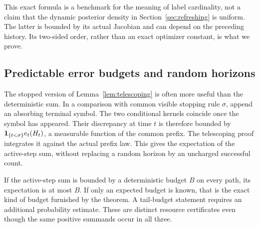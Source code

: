 This exact formula is a benchmark for the meaning of label cardinality,
not a claim that the dynamic posterior density in
Section~\ref{sec:refreshing} is uniform. The latter is bounded by its
actual Jacobian and can depend on the preceding history. Its two-sided
order, rather than an exact optimizer constant, is what we prove.

\subsection{Predictable error budgets and random horizons}
The stopped version of Lemma~\ref{lem:telescoping} is often more useful
than the deterministic sum. In a comparison with common visible stopping
rule $\sigma$, append an absorbing terminal symbol. The two conditional
kernels coincide once the symbol has appeared. Their discrepancy at time
$t$ is therefore bounded by $\mathbf 1_{\{t<\sigma\}}e_t(H_t)$, a measurable
function of the common prefix. The telescoping proof integrates it against
the actual prefix law. This gives the expectation of the active-step sum,
without replacing a random horizon by an uncharged successful count.

If the active-step sum is bounded by a deterministic budget $B$ on every
path, its expectation is at most $B$. If only an expected budget is known,
that is the exact kind of budget furnished by the theorem. A tail-budget
statement requires an additional probability estimate. These are distinct
resource certificates even though the same positive summands occur in
all three.
